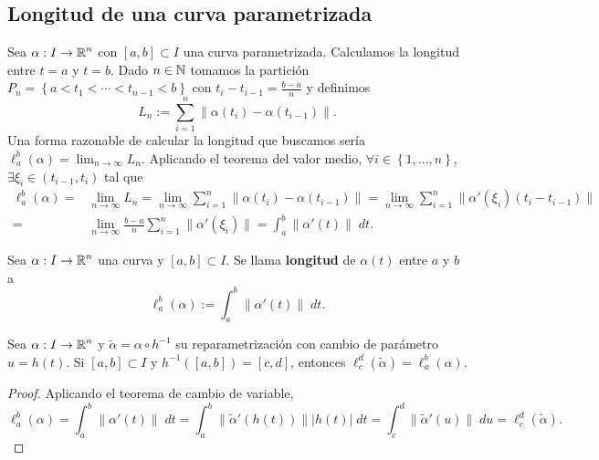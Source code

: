\subsection*{Longitud de una curva parametrizada}
Sea $\displaystyle \alpha : I\to \mathbb{R}^{n} $ con $\displaystyle \left[a,b\right] \subset I $ una curva parametrizada. Calculamos la longitud entre $\displaystyle t = a $ y $\displaystyle t = b $. Dado $\displaystyle n \in \mathbb{N} $ tomamos la partición $\displaystyle P_{n} = \left\{ a < t_{1} < \cdots < t_{n-1}< b\right\}  $ con $\displaystyle t_{i}-t_{i-1}=\frac{b-a}{n} $ y definimos 
\[ L_{n} := \sum^{n}_{i = 1} \|\alpha\left(t_{i}\right)-\alpha\left(t_{i-1}\right)\| .\]
Una forma razonable de calcular la longitud que buscamos sería $\displaystyle \ell^{b}_{a}\left(\alpha \right)= \lim_{n \to \infty}L_{n} $. Aplicando el teorema del valor medio, $\displaystyle \forall i \in \left\{ 1, \ldots, n\right\}  $, $\displaystyle \exists\xi_{i} \in \left(t_{i-1}, t_{i}\right) $ tal que 
\[
\begin{split}
	\ell ^{b}_{a}\left(\alpha \right)= &\lim_{n \to \infty}L_{n} = \lim_{n \to \infty}\sum^{n}_{i = 1}\|\alpha\left(t_{i}\right)-\alpha\left(t_{i-1}\right)\| = \lim_{n \to \infty}\sum^{n}_{i = 1} \|\alpha'\left(\xi_{i}\right)\left(t_{i}-t_{i-1}\right)\| \\
	= &  \lim_{n \to \infty}\frac{b-a}{n}\sum^{n}_{i = 1}\|\alpha'\left(\xi_{i}\right)\| = \int^{b}_{a} \|\alpha'\left(t\right)\| \; dt  .
\end{split}
\]
\begin{definition}
	Sea $\displaystyle \alpha : I \to \mathbb{R}^{n} $ una curva y $\displaystyle \left[a,b\right] \subset I $. Se llama \textbf{longitud} de $\displaystyle \alpha \left(t\right) $ entre $\displaystyle a $ y $\displaystyle b $ a
\[\ell^{b}_{a}\left(\alpha \right):=\int^{b}_{a} \|\alpha'\left(t\right)\| \; dt .\]
\end{definition}
\begin{prop}
	Sea $\displaystyle \alpha : I \to \mathbb{R}^{n} $ y $\displaystyle \tilde{\alpha} = \alpha \circ h^{-1} $ su reparametrización con cambio de parámetro $\displaystyle u = h\left(t\right) $. Si $\displaystyle \left[a,b\right] \subset I $ y $\displaystyle h^{-1}\left(\left[a,b\right] \right)=\left[c,d\right]  $, entonces $\displaystyle \ell^{d}_{c}\left(\tilde{\alpha}\right)=\ell^{b}_{a}\left(\alpha \right) $. 
\end{prop}
\begin{proof}
Aplicando el teorema de cambio de variable,
\[
	\ell^{b}_{a}\left(\alpha \right)=  \int^{b}_{a} \|\alpha'\left(t\right)\| \; dt = \int^{b}_{a} \|\tilde{\alpha}'\left(h\left(t\right)\right)\| \left|h\left(t\right)\right| \; dt = \int^{d}_{c} \|\tilde{\alpha}'\left(u\right)\| \; du = \ell^{d}_{c}\left(\tilde{\alpha}\right).
\]
\end{proof}
